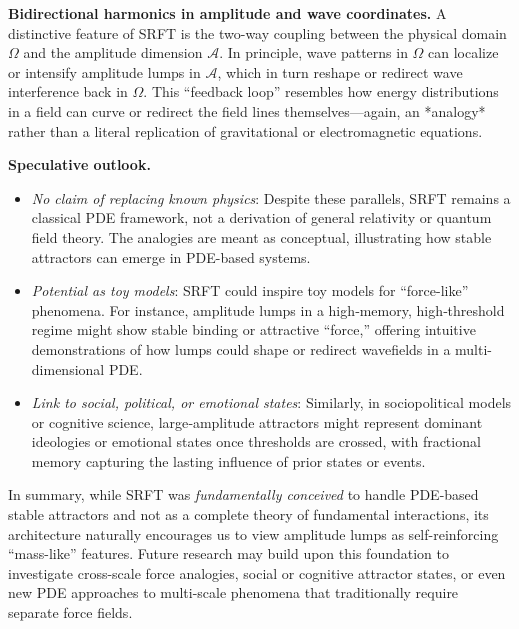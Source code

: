 \documentclass[12pt]{article}
\begin{document}
\medskip

\noindent
\textbf{Bidirectional harmonics in amplitude and wave coordinates.}
A distinctive feature of SRFT is the two-way coupling between the physical domain 
\(\Omega\) and the amplitude dimension \(\mathcal{A}\). In principle, wave 
patterns in \(\Omega\) can localize or intensify amplitude lumps in \(\mathcal{A}\), 
which in turn reshape or redirect wave interference back in \(\Omega\). This 
“feedback loop” resembles how energy distributions in a field can curve or redirect 
the field lines themselves—again, an *analogy* rather than a literal replication 
of gravitational or electromagnetic equations.

\medskip

\noindent
\textbf{Speculative outlook.}
\begin{itemize}
    \item \emph{No claim of replacing known physics}: 
          Despite these parallels, SRFT remains a classical PDE framework, not 
          a derivation of general relativity or quantum field theory. The 
          analogies are meant as conceptual, illustrating how stable attractors 
          can emerge in PDE-based systems.
    \item \emph{Potential as toy models}: 
          SRFT could inspire toy models for “force-like” phenomena. For instance, 
          amplitude lumps in a high‐memory, high‐threshold regime might show 
          stable binding or attractive “force,” offering intuitive demonstrations 
          of how lumps could shape or redirect wavefields in a multi-dimensional 
          PDE.
    \item \emph{Link to social, political, or emotional states}:
          Similarly, in sociopolitical models or cognitive science, large‐amplitude 
          attractors might represent dominant ideologies or emotional states 
          once thresholds are crossed, with fractional memory capturing the 
          lasting influence of prior states or events.
\end{itemize}

\noindent
In summary, while SRFT was \emph{fundamentally conceived} to handle PDE-based 
stable attractors and not as a complete theory of fundamental interactions, 
its architecture naturally encourages us to view amplitude lumps as 
self-reinforcing “mass-like” features. Future research may build upon this 
foundation to investigate cross-scale force analogies, social or cognitive 
attractor states, or even new PDE approaches to multi-scale phenomena that 
traditionally require separate force fields.
\end{document}
